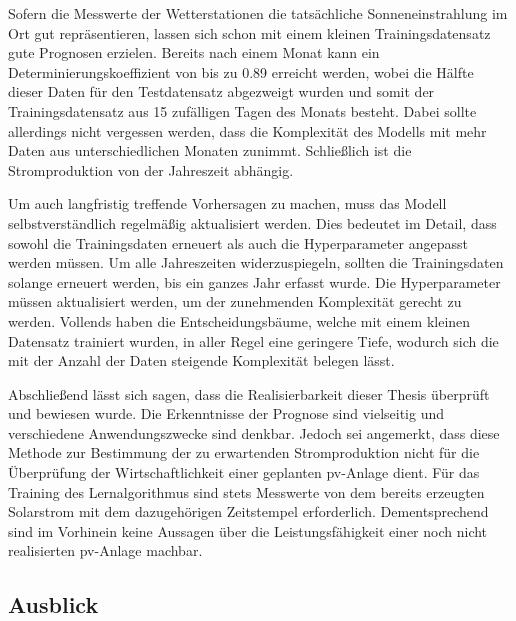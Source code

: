 \documentclass[12pt, a4paper]{article}
\begin{document}

Sofern die Messwerte der Wetterstationen die tatsächliche Sonneneinstrahlung im Ort gut repräsentieren, lassen sich schon mit einem kleinen Trainingsdatensatz gute Prognosen erzielen. Bereits nach einem Monat kann ein Determinierungskoeffizient von bis zu 0.89 erreicht werden, wobei die Hälfte dieser Daten für den Testdatensatz abgezweigt wurden und somit der Trainingsdatensatz aus 15 zufälligen Tagen des Monats besteht. Dabei sollte allerdings nicht vergessen werden, dass die Komplexität des Modells mit mehr Daten aus unterschiedlichen Monaten zunimmt. Schließlich ist die Stromproduktion von der Jahreszeit abhängig. 

Um auch langfristig treffende Vorhersagen zu machen, muss das Modell selbstverständlich regelmäßig aktualisiert werden. Dies bedeutet im Detail, dass sowohl die Trainingsdaten erneuert als auch die Hyperparameter angepasst werden müssen. Um alle Jahreszeiten widerzuspiegeln, sollten die Trainingsdaten solange erneuert werden, bis ein ganzes Jahr erfasst wurde. Die Hyperparameter müssen aktualisiert werden, um der zunehmenden Komplexität gerecht zu werden. Vollends haben die Entscheidungsbäume, welche mit einem kleinen Datensatz trainiert wurden, in aller Regel eine geringere Tiefe, wodurch sich die mit der Anzahl der Daten steigende Komplexität belegen lässt.

Abschließend lässt sich sagen, dass die Realisierbarkeit dieser Thesis überprüft und bewiesen wurde. Die Erkenntnisse der Prognose sind vielseitig und verschiedene Anwendungszwecke sind denkbar. Jedoch sei angemerkt, dass diese Methode zur Bestimmung der zu erwartenden Stromproduktion nicht für die Überprüfung der Wirtschaftlichkeit einer geplanten \ac{pv}-Anlage dient. Für das Training des Lernalgorithmus sind stets Messwerte von dem bereits erzeugten Solarstrom mit dem dazugehörigen Zeitstempel erforderlich. Dementsprechend sind im Vorhinein keine Aussagen über die Leistungsfähigkeit einer noch nicht realisierten \ac{pv}-Anlage machbar.

\newpage

\subsection{Ausblick}
\label{subsec:outlook}
\end{document}
